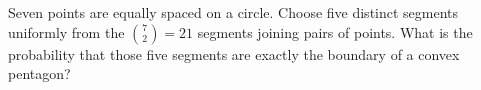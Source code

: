 Seven points are equally spaced on a circle. Choose five distinct segments uniformly from the $\binom72=21$ segments joining pairs of points. What is the probability that those five segments are exactly the boundary of a convex pentagon?

